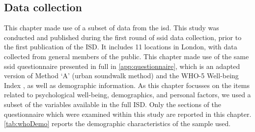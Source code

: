 \subsection{Data collection}
This chapter made use of a subset of data from the \gls{isd}. This study was conducted and published during the first round of \gls{ssid} data collection, prior to the first publication of the ISD. It includes 11 locations in London, with data collected from general members of the public. This chapter made use of the same \gls{ssid} questionnaire presented in full in \cref{app:questionnaire}, which is an adapted version of \citet{ISO12913Part2} Method `A' (urban soundwalk method) and the WHO-5 Well-being Index \citep{Hall2011Examining}, as well as demographic information. As this chapter focusses on the items related to psychological well-being, demographics, and personal factors, we used a subset of the variables available in the full ISD. Only the sections of the questionnaire which were examined within this study are reported in this chapter. \cref{tab:whoDemo} reports the demographic characteristics of the sample used.


